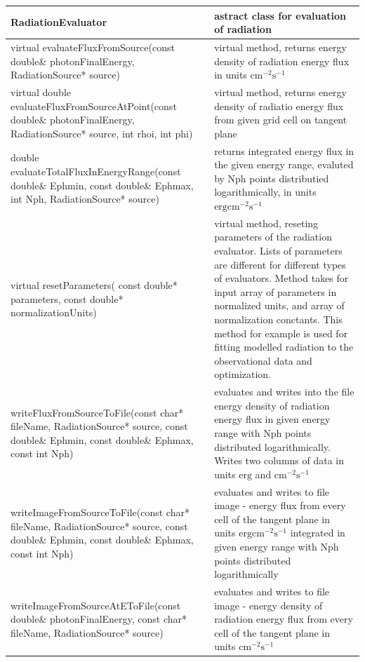 \begin{small}
	\label{radiationEvaluator}
	\begin{xtabular}{|p{0.51\textwidth}|p{0.49\textwidth}|} 
		\hline
		\textbf{RadiationEvaluator} & astract class for evaluation of radiation \\
		\hline
		virtual evaluateFluxFromSource(const double\& photonFinalEnergy, RadiationSource* source) & virtual method, returns energy density of radiation energy flux in units $\text{cm}^{-2} \text{s}^{-1}$ \\
		\hline
		virtual double evaluateFluxFromSourceAtPoint(const double\& photonFinalEnergy, RadiationSource* source, int rhoi, int phi) & virtual method, returns energy density of radiatio energy flux from given grid cell on tangent plane\\
		\hline
		double evaluateTotalFluxInEnergyRange(const double\& Ephmin, const double\& Ephmax, int Nph, RadiationSource* source) & returns integrated energy flux in the given energy range, evaluted by Nph points distributied logarithmically, in units $\text{erg} \text{cm}^{-2} \text{s}^{-1}$\\
		\hline
		virtual resetParameters( const double* parameters, const double* normalizationUnits) & virtual method, reseting parameters of the radiation evaluator. Lists of parameters are different for different types of evaluators. Method takes for input array of parameters in normalized units, and array of normalization conctants. This method for example is used for fitting modelled radiation to the observational data and optimization.\\
		\hline
		writeFluxFromSourceToFile(const char* fileName, RadiationSource* source, const double\& Ephmin, const double\& Ephmax, const int Nph) & evaluates and writes into the file energy density of radiation energy flux in given energy range with Nph points distributed logarithmically. Writes two columns of data in units $\text{erg}$  and $\text{cm}^{-2} \text{s}^{-1}$\\
		\hline
		writeImageFromSourceToFile(const char* fileName, RadiationSource* source, const double\& Ephmin, const double\& Ephmax, const int Nph) & evaluates and writes to file image - energy flux from every cell of the tangent plane in units $\text{erg} \text{cm}^{-2} \text{s}^{-1}$ integrated in given energy range with Nph points distributed logarithmically\\
		\hline
		writeImageFromSourceAtEToFile(const double\& photonFinalEnergy, const char* fileName, RadiationSource* source) & evaluates and writes to file image - energy density of radiation energy flux from every cell of the tangent plane in units $\text{cm}^{-2} \text{s}^{-1}$\\

\end{xtabular}
\end{small}
